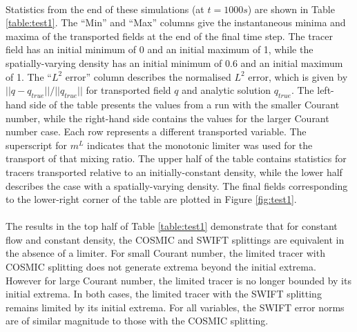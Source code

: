 \documentclass[11pt,a4paper]{article}
\begin{document}
\\
Statistics from the end of these simulations (at $t=1000 s$) are shown in Table \ref{table:test1}.
The ``Min'' and ``Max'' columns give the instantaneous minima and maxima of the transported fields at the end of the final time step.
The tracer field has an initial minimum of 0 and an initial maximum of 1, while the spatially-varying density has an initial minimum of 0.6 and an initial maximum of 1.
The ``$L^2$ error'' column describes the normalised $L^2$ error, which is given by $||q - q_{true}||/||q_{true}||$ for transported field $q$ and analytic solution $q_{true}$.
The left-hand side of the table presents the values from a run with the smaller Courant number, while the right-hand side contains the values for the larger Courant number case.
Each row represents a different transported variable.
The superscript for $m^L$ indicates that the monotonic limiter was used for the transport of that mixing ratio.
The upper half of the table contains statistics for tracers transported relative to an initially-constant density, while the lower half describes the case with a spatially-varying density.
The final fields corresponding to the lower-right corner of the table are plotted in Figure \ref{fig:test1}.\\
\\
The results in the top half of Table \ref{table:test1} demonstrate that for constant flow and constant density, the COSMIC and SWIFT splittings are equivalent in the absence of a limiter.
For small Courant number, the limited tracer with COSMIC splitting does not generate extrema beyond the initial extrema.
However for large Courant number, the limited tracer is no longer bounded by its initial extrema.
In both cases, the limited tracer with the SWIFT splitting remains limited by its initial extrema.
For all variables, the SWIFT error norms are of similar magnitude to those with the COSMIC splitting.
\end{document}
